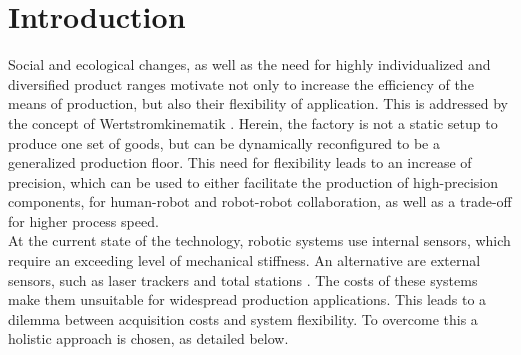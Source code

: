 \documentclass[5p,times,procedia]{elsarticle}
\begin{document}
\section{Introduction}
%
Social and ecological changes, as well as the need for
highly individualized and diversified product ranges
motivate not only to increase the efficiency of the means
of production, but also their flexibility of application.
This is addressed by the concept of Wertstromkinematik \cite{Muehlbeier2020}. Herein, the factory is not a static setup to produce one set of goods, but can be dynamically reconfigured to be a generalized production floor. This need for flexibility leads to an increase of precision, which can be used to either facilitate the production of high-precision components, for human-robot and robot-robot collaboration, as well as a trade-off for higher process speed.\\
At the current state of the technology, robotic systems use internal sensors, which require an exceeding level of mechanical stiffness. An alternative are external sensors, such as laser trackers and total stations \cite{Moeller17, Yang17}. The costs of these systems make them unsuitable for widespread production applications. This leads to a dilemma between acquisition costs and system flexibility. To overcome this a holistic approach is chosen, as detailed below.
%
%
\end{document}
